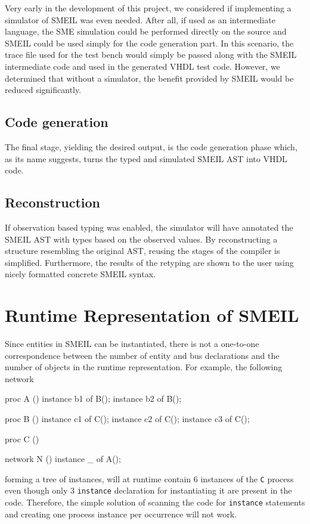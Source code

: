 Very early in the development of this project, we considered if implementing a
simulator of SMEIL was even needed. After all, if used as an intermediate
language, the SME simulation could be performed directly on the source and SMEIL
could be used simply for the code generation part. In this scenario, the trace
file used for the test bench would simply be passed along with the SMEIL
intermediate code and used in the generated VHDL test code. However, we
determined that without a simulator, the benefit provided by SMEIL would be
reduced significantly.

\subsection{Code generation}
The final stage, yielding the desired output, is the code generation phase
which, as its name suggests, turns the typed and simulated SMEIL AST into VHDL
code.
\subsection{Reconstruction} If observation based typing was enabled, the
simulator will have annotated the SMEIL AST with types based on the observed
values. By reconstructing a structure resembling the original AST, reusing the
stages of the compiler is simplified. Furthermore, the results of the retyping
are shown to the user using nicely formatted concrete SMEIL syntax.

\section{Runtime Representation of SMEIL}
Since entities in SMEIL can be instantiated, there is not a one-to-one
correspondence between the number of entity and bus declarations and the number
of objects in the runtime representation. For example, the following network
\begin{smeilcode2}
proc A ()
    instance b1 of B();
    instance b2 of B();
{}

proc B ()
    instance c1 of C();
    instance c2 of C();
    instance c3 of C();
{}

proc C ()
{}

network N () {
    instance _ of A();
}
\end{smeilcode2}
forming a tree of instances, will at runtime contain 6 instances of the {\tt C}
process even though only 3 {\tt instance} declaration for instantiating it are
present in the code. Therefore, the simple solution of scanning the code for
{\tt instance} statements and creating one process instance per occurrence will
not work.

